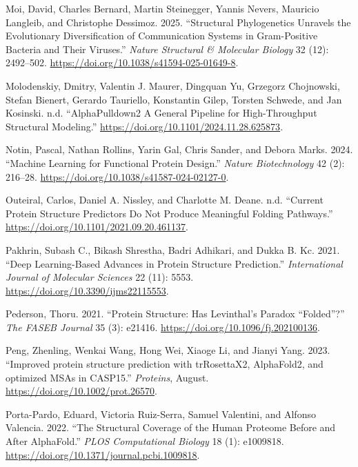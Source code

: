 \documentclass[
]{scrbook}
\newlength{\cslhangindent}
\newenvironment{CSLReferences}[2] %
 {\begin{list}{}{%
  \setlength{\itemindent}{0pt}
  \setlength{\leftmargin}{0pt}
  \setlength{\parsep}{0pt}
  \ifodd #1
   \setlength{\leftmargin}{\cslhangindent}
   \setlength{\itemindent}{-1\cslhangindent}
  \fi
  \setlength{\itemsep}{#2\baselineskip}}}
 {\end{list}}
\begin{document}
\begin{CSLReferences}{1}{0}
Moi, David, Charles Bernard, Martin Steinegger, Yannis Nevers, Mauricio
Langleib, and Christophe Dessimoz. 2025. {``Structural Phylogenetics
Unravels the Evolutionary Diversification of Communication Systems in
Gram-Positive Bacteria and Their Viruses.''} \emph{Nature Structural \&
Molecular Biology} 32 (12): 2492--502.
\url{https://doi.org/10.1038/s41594-025-01649-8}.

Molodenskiy, Dmitry, Valentin J. Maurer, Dingquan Yu, Grzegorz
Chojnowski, Stefan Bienert, Gerardo Tauriello, Konstantin Gilep, Torsten
Schwede, and Jan Kosinski. n.d. {``AlphaPulldown2 {\textendash} A
General Pipeline for High-Throughput Structural Modeling.''}
\url{https://doi.org/10.1101/2024.11.28.625873}.

Notin, Pascal, Nathan Rollins, Yarin Gal, Chris Sander, and Debora
Marks. 2024. {``Machine Learning for Functional Protein Design.''}
\emph{Nature Biotechnology} 42 (2): 216--28.
\url{https://doi.org/10.1038/s41587-024-02127-0}.

Outeiral, Carlos, Daniel A. Nissley, and Charlotte M. Deane. n.d.
{``Current Protein Structure Predictors Do Not Produce Meaningful
Folding Pathways.''} \url{https://doi.org/10.1101/2021.09.20.461137}.

Pakhrin, Subash C., Bikash Shrestha, Badri Adhikari, and Dukka B. Kc.
2021. {``Deep Learning-Based Advances in Protein Structure
Prediction.''} \emph{International Journal of Molecular Sciences} 22
(11): 5553. \url{https://doi.org/10.3390/ijms22115553}.

Pederson, Thoru. 2021. {``Protein Structure: Has Levinthal's Paradox
{``}Folded{''}?''} \emph{The FASEB Journal} 35 (3): e21416.
\url{https://doi.org/10.1096/fj.202100136}.

Peng, Zhenling, Wenkai Wang, Hong Wei, Xiaoge Li, and Jianyi Yang. 2023.
{``Improved protein structure prediction with trRosettaX2, AlphaFold2,
and optimized MSAs in CASP15.''} \emph{Proteins}, August.
\url{https://doi.org/10.1002/prot.26570}.

Porta-Pardo, Eduard, Victoria Ruiz-Serra, Samuel Valentini, and Alfonso
Valencia. 2022. {``The Structural Coverage of the Human Proteome Before
and After AlphaFold.''} \emph{PLOS Computational Biology} 18 (1):
e1009818. \url{https://doi.org/10.1371/journal.pcbi.1009818}.


\end{CSLReferences}
\end{document}
